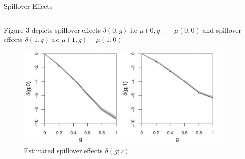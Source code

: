 \documentclass[notes,11pt, aspectratio=169]{beamer}
\begin{document}
\begin{frame}{Spillover Effects}
\begin{columns}[T] %
\begin{column}{\textwidth}
  \begin{wideitemize}
  \item  Figure 3 depicts spillover effects $\delta(0,g)$  i.e $\mu(0,g)-\mu(0,0)$ and spillover effects $\delta(1,g)$ i.e $\mu(1,g)-\mu(1,0)$ 
   \begin{figure}[h]
   \centering
   \includegraphics[scale=0.6]{figure3.png}
   \caption{Estimated spillover effects $\delta(g;z)$}
   \label{fig:fig3}
   \end{figure}
  \end{wideitemize}
\end{column}%
\hfill%
\begin{column}{.38\textwidth}
  \vspace{20pt}
  \vspace{20pt}
\end{column}%
\end{columns}
\end{frame}
\end{document}
